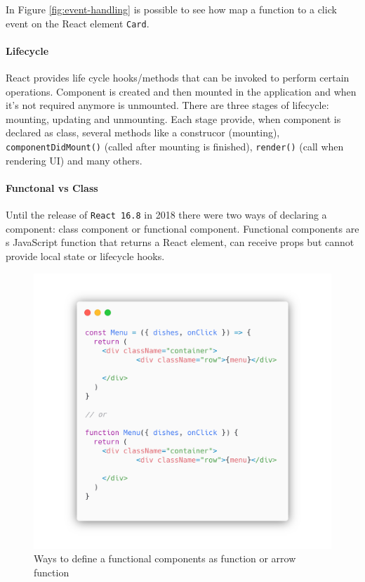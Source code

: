 In Figure \ref{fig:event-handling} is possible to see how map a function to a click event on the React element \texttt{Card}.

\paragraph*{Lifecycle}
React provides life cycle hooks/methods that can be invoked to perform certain operations. Component is created and then mounted in the application and when it's not required anymore is unmounted. There are three stages of lifecycle: mounting, updating and unmounting. Each stage provide, when component is declared as class, several methods like a construcor (mounting), \texttt{componentDidMount()} (called after mounting is finished), \texttt{render()} (call when rendering UI) and many others.

\paragraph*{Functonal vs Class}
Until the release of \texttt{React 16.8} in 2018 there were two ways of declaring a component: class component or functional component. Functional components are s JavaScript function that returns a React element, can receive props but cannot provide local state or lifecycle hooks. 
\begin{figure}
    \includegraphics[width=\textwidth]{assets/class-vs-functional.png}
    \caption{Ways to define a functional components as function or arrow function}
\end{figure}

